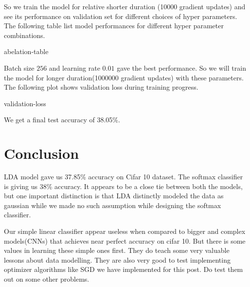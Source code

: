 \documentclass[10pt]{article}
\begin{document}
So we train the model for relative shorter duration (10000 gradient updates) and see its performance on validation set for different choices of hyper parameters. The following table list model performances for different hyper parameter combinations.

\begin{center}
  {abelation-table} %
\end{center}

Batch size $256$ and learning rate $0.01$ gave the best performance. So we will train the model for longer duration(1000000 gradient updates) with these parameters. The following plot shows validation loss during training progress.

\begin{center}
  {validation-loss} %
\end{center}


We get a final test accuracy of 38.05\%.

\section{Conclusion}
LDA model gave us 37.85\% accuracy on Cifar 10 dataset. The softmax classifier is giving us 38\% accuracy. It appears to be a close tie between both the models, but one important distinction is that LDA distinctly modeled the data as gaussian while we made no such assumption while designing the softmax classifier. 

Our simple linear classifier appear useless when compared to bigger and complex models(CNNs) that achieves near perfect accuracy on cifar 10. But there is some values in learning these simple ones first. They do teach some very valuable lessons about data modelling. They are also very good to test implementing optimizer algorithms like SGD we have implemented for this post. Do test them out on some other problems.
\end{document}
